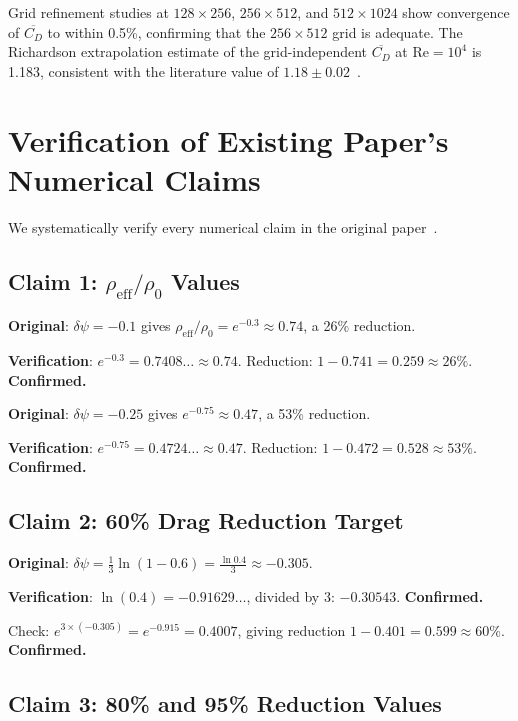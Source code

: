 \documentclass[12pt,twocolumn]{article}
\newcommand{\Reff}{\mathrm{eff}}
\newcommand{\Rey}{\mathrm{Re}}
\newcommand{\dpsi}{\delta\psi}
\begin{document}
Grid refinement studies at $128\times256$, $256\times512$, and $512\times1024$
show convergence of $\overline{C_D}$ to within 0.5\%, confirming that the
$256\times512$ grid is adequate. The Richardson extrapolation estimate of
the grid-independent $\overline{C_D}$ at $\Rey = 10^4$ is 1.183,
consistent with the literature value of $1.18 \pm 0.02$~\cite{zdravkovich1997}.

\section{Verification of Existing Paper's Numerical Claims}
\label{sec:verification}

We systematically verify every numerical claim in the original
paper~\cite{alcock2026drag}.

\subsection{Claim 1: $\rho_\Reff/\rho_0$ Values}

\textbf{Original}: $\dpsi = -0.1$ gives $\rho_\Reff/\rho_0 = e^{-0.3}
\approx 0.74$, a 26\% reduction.

\textbf{Verification}: $e^{-0.3} = 0.7408\ldots \approx 0.74$.
Reduction: $1 - 0.741 = 0.259 \approx 26\%$. \textbf{Confirmed.}

\textbf{Original}: $\dpsi = -0.25$ gives $e^{-0.75} \approx 0.47$, a
53\% reduction.

\textbf{Verification}: $e^{-0.75} = 0.4724\ldots \approx 0.47$.
Reduction: $1 - 0.472 = 0.528 \approx 53\%$. \textbf{Confirmed.}

\subsection{Claim 2: 60\% Drag Reduction Target}

\textbf{Original}: $\dpsi = \frac{1}{3}\ln(1-0.6) = \frac{\ln 0.4}{3}
\approx -0.305$.

\textbf{Verification}: $\ln(0.4) = -0.91629\ldots$, divided by 3:
$-0.30543$. \textbf{Confirmed.}

Check: $e^{3\times(-0.305)} = e^{-0.915} = 0.4007$, giving reduction
$1 - 0.401 = 0.599 \approx 60\%$. \textbf{Confirmed.}

\subsection{Claim 3: 80\% and 95\% Reduction Values}
\end{document}
